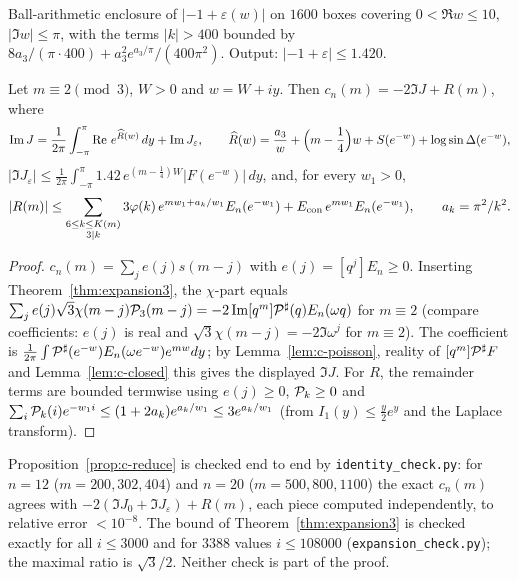 \begin{certificate}\label{cert:c-poisson}
Ball-arithmetic enclosure of $|{-1}+\varepsilon(w)|$ on $1600$ boxes covering $0<\Re w\le10$, $|\Im w|\le\pi$, with the
terms $|k|>400$ bounded by $8a_3/(\pi\cdot400)+a_3^2e^{a_3/\pi}/(400\pi^2)$. Output: $|{-1}+\varepsilon|\le1.420$.
\end{certificate}

\begin{proposition}[reduction]\label{prop:c-reduce}
Let $m\equiv2\pmod3$, $W>0$ and $w=W+iy$. Then $c_n(m)=-2\Im J+R(m)$, where
\[
\operatorname{Im} J=\frac1{2\pi}\int_{-\pi}^{\pi}\operatorname{Re}\, e^{\widehat R(w)}\,dy+\operatorname{Im} J_\varepsilon,\qquad
\widehat R(w)=\frac{a_3}w+\Big(m-\frac14\Big)w+S(e^{-w})+\log\sin\Delta(e^{-w}),
\]
$|\Im J_\varepsilon|\le\frac1{2\pi}\int_{-\pi}^{\pi}1.42\,e^{(m-\frac14)W}|F(e^{-w})|\,dy$, and, for every $w_1>0$,
\[
|R(m)|\le\sum_{\substack{6\le k\le K(m)\\3\mid k}}3\varphi(k)\,e^{mw_1+a_k/w_1}E_n(e^{-w_1})+E_{\mathrm{con}}\,e^{mw_1}E_n(e^{-w_1}),
\qquad a_k=\pi^2/k^2 .
\]
\end{proposition}
\begin{proof}
$c_n(m)=\sum_je(j)s(m-j)$ with $e(j)=[q^j]E_n\ge0$. Inserting Theorem~\ref{thm:expansion3}, the $\chi$-part equals
$\sum_je(j)\sqrt3\chi(m-j)\mathcal P_3(m-j)=-2\operatorname{Im}[q^m]\mathcal P^\sharp(q)E_n(\omega q)$ for $m\equiv2$ (compare coefficients: $e(j)$ is
real and $\sqrt3\chi(m-j)=-2\Im\omega^{j}$ for $m\equiv2$). The coefficient is
$\frac1{2\pi}\int\mathcal P^\sharp(e^{-w})E_n(\omega e^{-w})e^{mw}dy$; by Lemma~\ref{lem:c-poisson}, reality of
$[q^m]\mathcal P^\sharp F$ and Lemma~\ref{lem:c-closed} this gives the displayed $\Im J$. For $R$, the remainder terms are bounded
termwise using $e(j)\ge0$, $\mathcal P_k\ge0$ and $\sum_i\mathcal P_k(i)e^{-w_1i}\le(1+2a_k)e^{a_k/w_1}\le3e^{a_k/w_1}$ (from
$I_1(y)\le\frac y2e^y$ and the Laplace transform).
\end{proof}

\begin{remark}\label{rem:c-identity}
Proposition~\ref{prop:c-reduce} is checked end to end by \texttt{identity\_check.py}: for $n=12$ ($m=200,302,404$) and
$n=20$ ($m=500,800,1100$) the exact $c_n(m)$ agrees with $-2(\Im J_0+\Im J_\varepsilon)+R(m)$, each piece computed
independently, to relative error $<10^{-8}$. The bound of Theorem~\ref{thm:expansion3} is checked exactly for all
$i\le3000$ and for $3388$ values $i\le108000$ (\texttt{expansion\_check.py}); the maximal ratio is $\sqrt3/2$. Neither
check is part of the proof.
\end{remark}

